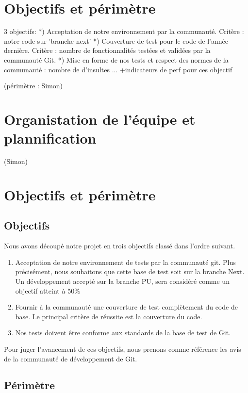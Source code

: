 \documentclass[11pt]{article}
\begin{document}
\section*{Objectifs et périmètre}
3 objectifs:
*) Acceptation de notre environnement par la communauté. Critère : notre code sur 'branche next'
*) Couverture de test pour le code de l'année dernière. Critère : nombre de fonctionnalités testées et validées par la       communauté Git.
*) Mise en forme de nos tests et respect des normes de la communauté : nombre de d'insultes ...
+indicateurs de perf pour ces objectif

(périmètre : Simon)

\section*{Organistation de l'équipe et plannification}
(Simon)



\section{Objectifs et périmètre}
\subsection{Objectifs}
Nous avons découpé notre projet en trois objectifs classé dans l'ordre suivant.
\begin{enumerate}
\item Acceptation de notre environnement de tests par la communauté git. Plus précisément, nous souhaitons que cette base de test soit sur la branche Next. Un développement accepté sur la branche PU, sera considéré comme un objectif atteint à 50\%
\item Fournir à la communauté une couverture de test complètement du code de base. Le principal critère de réussite est la couverture du code.
\item Nos tests doivent être conforme aux standards de la base de test de Git.
\end{enumerate}
Pour juger l'avancement de ces objectifs, nous prenons comme référence les avis de la communauté de développement de Git.\\
\subsection{Périmètre}
\end{document}
